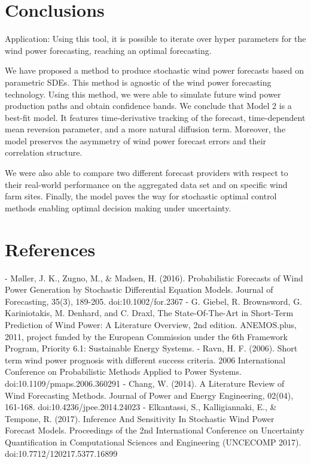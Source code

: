 \documentclass[10pt,twocolumn,letterpaper]{article}
\begin{document}
\section{Conclusions} \label{Section_8}

{\color{red} Application: Using this tool, it is possible to iterate over hyper parameters for the wind power forecasting, reaching an optimal forecasting.}

We have proposed a method to produce stochastic wind power forecasts based on parametric SDEs. This method is agnostic of the wind power forecasting technology. Using this method, we were able to simulate future wind power production paths and obtain confidence bands. We conclude that Model 2 is a best-fit model. It features time-derivative tracking of the forecast, time-dependent mean reversion parameter, and a more natural diffusion term. Moreover, the model preserves the asymmetry of wind power forecast errors and their correlation structure.

We were also able to compare two different forecast providers with respect to their real-world performance on the aggregated data set and on specific wind farm sites. Finally, the model paves the way for stochastic optimal control methods enabling optimal decision making under uncertainty.


\section*{References}
\begin{flushleft}
- M\o ller, J. K., Zugno, M., \& Madsen, H. (2016). Probabilistic Forecasts of Wind Power Generation by Stochastic Differential Equation Models. Journal of Forecasting, 35(3), 189-205. doi:10.1002/for.2367 \linebreak
- G. Giebel, R. Brownsword, G. Kariniotakis, M. Denhard, and C. Draxl, The State-Of-The-Art in Short-Term Prediction of Wind Power: A Literature Overview, 2nd edition. ANEMOS.plus, 2011, project funded by the European Commission under the 6th Framework Program, Priority 6.1: Sustainable Energy Systems.\linebreak
- Ravn, H. F. (2006). Short term wind power prognosis with different success criteria. 2006 International Conference on Probabilistic Methods Applied to Power Systems. doi:10.1109/pmaps.2006.360291 \linebreak
- Chang, W. (2014). A Literature Review of Wind Forecasting Methods. Journal of Power and Energy Engineering, 02(04), 161-168. doi:10.4236/jpee.2014.24023\linebreak
- Elkantassi, S., Kalligiannaki, E., \& Tempone, R. (2017). Inference And Sensitivity In Stochastic Wind Power Forecast Models. Proceedings of the 2nd International Conference on Uncertainty Quantification in Computational Sciences and Engineering (UNCECOMP 2017). doi:10.7712/120217.5377.16899
\end{flushleft}

% 
% 
\end{document}
